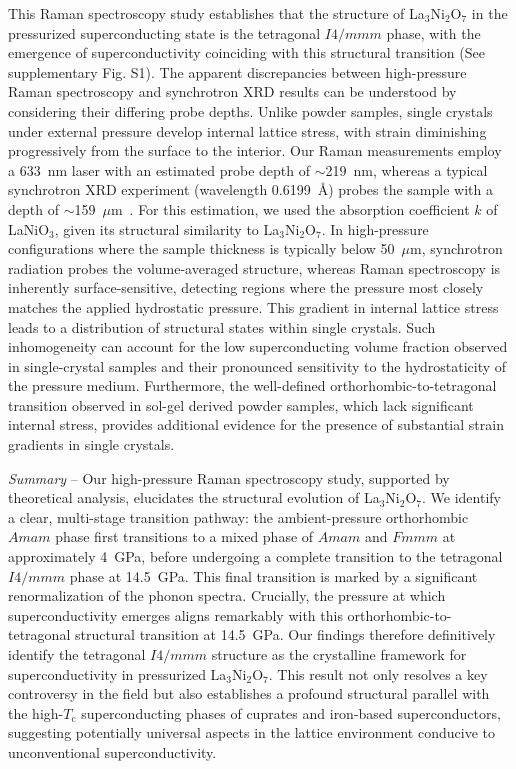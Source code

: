 \documentclass[prx,aps,twocolumn,preprintnumbers,amsmath,amssymb,superscriptaddress,showpacs]{revtex4-2}
\begin{document}
This Raman spectroscopy study establishes that the structure of La$_3$Ni$_2$O$_7$ in the pressurized superconducting state is the tetragonal $I4/mmm$ phase, with the emergence of superconductivity coinciding with this structural transition (See supplementary Fig. S1). The apparent discrepancies between high-pressure Raman spectroscopy and synchrotron XRD results can be understood by considering their differing probe depths. Unlike powder samples, single crystals under external pressure develop internal lattice stress, with strain diminishing progressively from the surface to the interior. Our Raman measurements employ a 633~nm laser with an estimated probe depth of $\sim$219~nm, whereas a typical synchrotron XRD experiment (wavelength 0.6199~\AA) probes the sample with a depth of $\sim$159~$\mu$m~\cite{Borowicz2016}. For this estimation, we used the absorption coefficient $k$ of LaNiO$_3$, given its structural similarity to La$_3$Ni$_2$O$_7$. In high-pressure configurations where the sample thickness is typically below 50~$\mu$m, synchrotron radiation probes the volume-averaged structure, whereas Raman spectroscopy is inherently surface-sensitive, detecting regions where the pressure most closely matches the applied hydrostatic pressure. This gradient in internal lattice stress leads to a distribution of structural states within single crystals. Such inhomogeneity can account for the low superconducting volume fraction observed in single-crystal samples and their pronounced sensitivity to the hydrostaticity of the pressure medium. Furthermore, the well-defined orthorhombic-to-tetragonal transition observed in sol-gel derived powder samples, which lack significant internal stress, provides additional evidence for the presence of substantial strain gradients in single crystals. 


{\it Summary} -- Our high-pressure Raman spectroscopy study, supported by theoretical analysis, elucidates the structural evolution of La$_3$Ni$_2$O$_7$. We identify a clear, multi-stage transition pathway: the ambient-pressure orthorhombic $Amam$ phase first transitions to a mixed phase of $Amam$ and $Fmmm$ at approximately 4~GPa, before undergoing a complete transition to the tetragonal $I4/mmm$ phase at 14.5~GPa. This final transition is marked by a significant renormalization of the phonon spectra. Crucially, the pressure at which superconductivity emerges aligns remarkably with this orthorhombic-to-tetragonal structural transition at 14.5~GPa. Our findings therefore definitively identify the tetragonal $I4/mmm$ structure as the crystalline framework for superconductivity in pressurized La$_3$Ni$_2$O$_7$. This result not only resolves a key controversy in the field but also establishes a profound structural parallel with the high-$T_\text{c}$ superconducting phases of cuprates and iron-based superconductors, suggesting potentially universal aspects in the lattice environment conducive to unconventional superconductivity.
 
\end{document}
